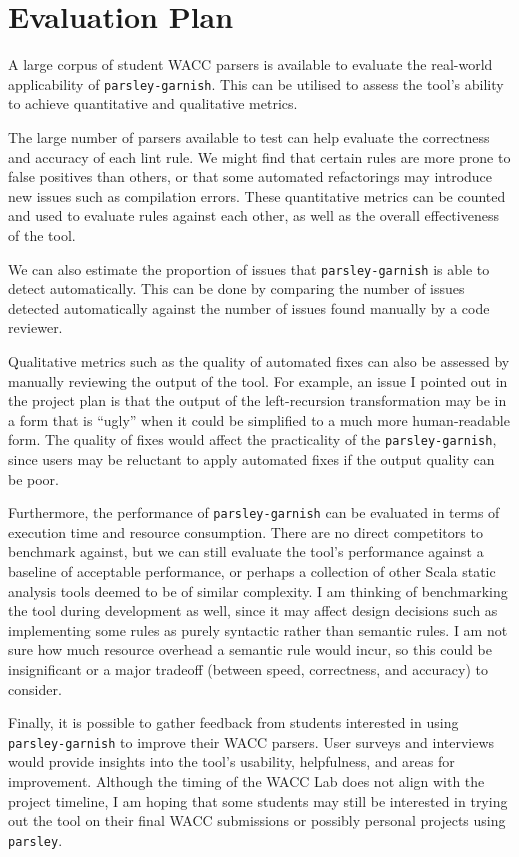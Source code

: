 \chapter{Evaluation Plan}

A large corpus of student WACC parsers is available to evaluate the real-world applicability of \texttt{parsley-garnish}.
This can be utilised to assess the tool's ability to achieve quantitative and qualitative metrics.

The large number of parsers available to test can help evaluate the correctness and accuracy of each lint rule.
We might find that certain rules are more prone to false positives than others, or that some automated refactorings may introduce new issues such as compilation errors.
These quantitative metrics can be counted and used to evaluate rules against each other, as well as the overall effectiveness of the tool.

We can also estimate the proportion of issues that \texttt{parsley-garnish} is able to detect automatically.
This can be done by comparing the number of issues detected automatically against the number of issues found manually by a code reviewer.

Qualitative metrics such as the quality of automated fixes can also be assessed by manually reviewing the output of the tool.
For example, an issue I pointed out in the project plan is that the output of the left-recursion transformation may be in a form that is ``ugly'' when it could be simplified to a much more human-readable form.
The quality of fixes would affect the practicality of the \texttt{parsley-garnish}, since users may be reluctant to apply automated fixes if the output quality can be poor.

Furthermore, the performance of \texttt{parsley-garnish} can be evaluated in terms of execution time and resource consumption.
There are no direct competitors to benchmark against, but we can still evaluate the tool's performance against a baseline of acceptable performance, or perhaps a collection of other Scala static analysis tools deemed to be of similar complexity.
I am thinking of benchmarking the tool during development as well, since it may affect design decisions such as implementing some rules as purely syntactic rather than semantic rules.
I am not sure how much resource overhead a semantic rule would incur, so this could be insignificant or a major tradeoff (between speed, correctness, and accuracy) to consider.

Finally, it is possible to gather feedback from students interested in using \texttt{parsley-garnish} to improve their WACC parsers.
User surveys and interviews would provide insights into the tool's usability, helpfulness, and areas for improvement.
Although the timing of the WACC Lab does not align with the project timeline, I am hoping that some students may still be interested in trying out the tool on their final WACC submissions or possibly personal projects using \texttt{parsley}.